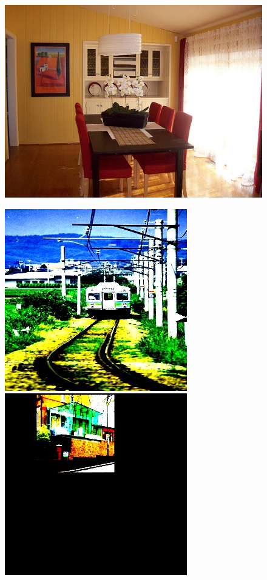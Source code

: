 \documentclass[a4paper]{article}
\begin{document}
\begin{figure}[h]
\begin{multicols}{4}
		\includegraphics[width=0.8\linewidth]{fig/unnormalize/000006}
	\end{multicols}
	\begin{multicols}{4}
		\includegraphics[width=0.8\linewidth]{fig/normalize/_1}
		\includegraphics[width=0.8\linewidth]{fig/normalize/_2}

\end{multicols}
\end{figure}
\end{document}
